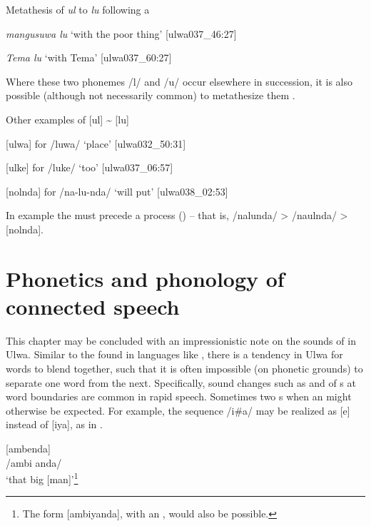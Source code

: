 \newpage

\ea%
    \label{ex:phon:95}
          Metathesis of \textit{ul} to \textit{lu} following a 

    \ea  \textit{mangusuwa lu} ‘with the poor thing’ [ulwa037\_46:27]

    \ex  \textit{Tema lu} ‘with Tema’ [ulwa037\_60:27]
    \z
\z

Where these two phonemes /l/ and /u/ occur elsewhere in succession, it is also possible (although not necessarily common) to metathesize them .

\ea%
    \label{ex:phon:96}

          Other examples of [ul] {\textasciitilde} [lu] 

    \ea{}  [ulwa] for /luwa/ ‘place’ [ulwa032\_50:31]

    \ex{}  [ulke] for /luke/ ‘too’ [ulwa037\_06:57]

    \ex{}\label{ex:phon:96c}  [nolnda] for /na-lu-nda/ ‘will put’ [ulwa038\_02:53]
    \z
\z

In example  the  must precede a  process () -- that is, /nalunda/ > /naulnda/ > [nolnda].


\section{Phonetics and phonology of connected speech}\label{sec:2.7}


This chapter may be concluded with an impressionistic note on the sounds of  in Ulwa. Similar to the  found in languages like , there is a tendency in Ulwa for words to blend together, such that it is often impossible (on phonetic grounds) to separate one word from the next. Specifically, sound changes such as  and  of s at word boundaries are common in rapid speech. Sometimes two s  when an   might otherwise be expected. For example, the sequence /i\#a/ may be realized as [e] instead of [iya], as in .

\ea%
    \label{ex:phon:97}
[ambenda]\\
/ambi anda/\\
‘that big [man]’\footnote{The form [ambiyanda], with an  , would also be possible.}\\
  \z

